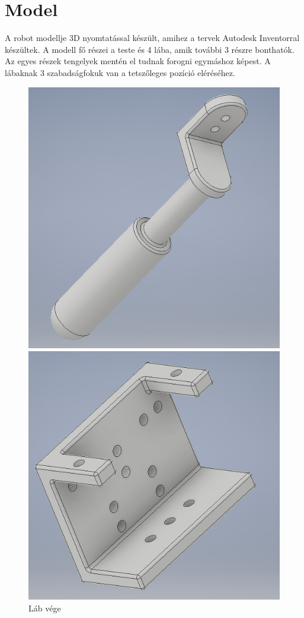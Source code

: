 \documentclass{article}
\begin{document}
\section{Model}
A robot modellje 3D nyomtatással készült, amihez a tervek Autodesk Inventorral készültek. A modell fő részei a teste és 4 lába, amik további 3 részre bonthatók. Az egyes részek tengelyek mentén el tudnak forogni egymáshoz képest. A lábaknak 3 szabadságfokuk van a tetszőleges pozíció eléréséhez.
\begin{figure}[h]
	\centering
	\begin{minipage}{0.3\textwidth}
		\centering
		\includegraphics[width=\textwidth]{labveg}
		\caption{Láb vége}
	\end{minipage}\hfill
	\begin{minipage}{0.3\textwidth}
		\centering
		\includegraphics[width=\textwidth]{motortarto}

\end{minipage}
\end{figure}
\end{document}
